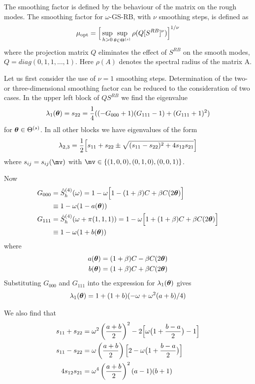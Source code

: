 \documentclass{article}
\begin{document}
The smoothing factor is defined by the behaviour of the matrix on the rough modes.
The smoothing factor for $\omega$-GS-RB, with $\nu$ smoothing steps, is defined as 
\[
  \mu_{\rm opt} = \Big[ \sup_{h>0} \sup_{\theta\in\Theta^{(s)}} \rho( Q [S^{RB}]^\nu ) \Big]^{1/\nu}
\]
where the projection matrix $Q$ eliminates the effect of $S^{RB}$ on the smooth modes,
$Q=diag(0,1,1,\dots,1)$.  Here $\rho(A)$ denotes the spectral radius of the matrix A.


Let us first consider the use of $\nu=1$ smoothing steps.
Determination of the two- or three-dimensional smoothing factor
can be reduced to the consideration of two cases. 
In the upper left block of $Q S^{RB}$ we find the eigenvalue
\[
  \lambda_1(\boldsymbol{\theta}) = s_{22} = {1\over 4}( (-G_{000}+1)(G_{111}-1) + (G_{111}+1)^2 )
\]
for $\boldsymbol{\theta}\in\Theta^{(s)}$.
In all other blocks we have eigenvalues of the form
\[
  \lambda_{2,3} = {1\over 2}\Big[ s_{11}+s_{22} \pm \sqrt{ (s_{11}-s_{22})^2 + 4 s_{12}s_{21} } \Big]
\]
where $s_{ij}=s_{ij}(\mv)$ with $\mv\in \{(1,0,0),(0,1,0),(0,0,1)\}$.

Now
\begin{align*}
G_{000} &= \hat{S}_h^{(4)}(\omega) = 1-\omega\Big[ 1 - (1+\beta)C + \beta C(2\boldsymbol{\theta}) \Big] \\
        & \equiv 1-\omega( 1- a(\boldsymbol{\theta}) ) \\
G_{111} &= \hat{S}_h^{(4)}(\omega+\pi(1,1,1)) = 1-\omega\Big[ 1 + (1+\beta)C + \beta C(2\boldsymbol{\theta}) \Big] \\
        & \equiv 1-\omega( 1 + b(\boldsymbol{\theta}) ) 
\end{align*}
where
\begin{align*}
   a(\boldsymbol{\theta})=(1+\beta)C - \beta C(2\boldsymbol{\theta}) \\
   b(\boldsymbol{\theta})=(1+\beta)C + \beta C(2\boldsymbol{\theta})
\end{align*}
Substituting $G_{000}$ and $G_{111}$ into the expression for $\lambda_1(\boldsymbol{\theta})$ gives
\[
  \lambda_1(\boldsymbol{\theta}) = 1 + (1+b) ( -\omega + \omega^2(a+b)/4 )
\]


We also find that
\begin{align*}
  s_{11}+s_{22} &= \omega^2 \left( {a+b\over 2} \right)^2 - 2\Big[ \omega\big( 1 + {b-a\over 2} \big) -1 \Big] \\
  s_{11}-s_{22} &= \omega\left( {a+b\over 2}\right) \Big[ 2-\omega\big( 1 + {b-a\over 2} \big)\Big] \\ 
  4 s_{12}s_{21}&= \omega^4 \left( {a+b\over 2}\right)^2 (a-1)(b+1)
\end{align*}
\end{document}
